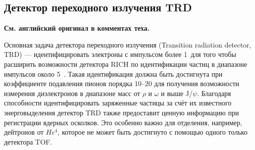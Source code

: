 

\subsection{Детектор переходного излучения TRD}\label{sec:secTRD}

\textbf{См. английский оригинал в комментах теха.}

Основная задача детектора переходного излучения (Transition radiation detector, TRD) --- идентифицировать электроны с импульсом более 1~\GeVoverC для того чтобы расширить возможности детектора RICH по идентификации частиц в диапазоне импульсов около 5~\GeVoverC.
Такая идентификация должна быть достигнута при коэффициенте подавления пионов порядка 10--20 для получения возможности измерения диэлектронов в диапазоне масс от $\rho$ и $\omega$ и выше J/$\psi$.
Благодаря способности идентифицировать заряженные частицы за счёт их известного энерговыделения детектор TRD также предоставит ценную информацию при регистрации ядерных осколков.
Это особенно важно для отделения, например, дейтронов от $ He^{4} $, которое не может быть достигнуто с помощью одного только детектора TOF.


